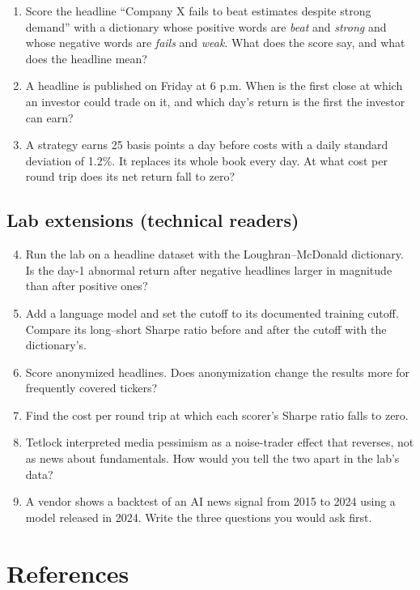 \begin{enumerate}
  \item Score the headline ``Company X fails to beat estimates despite strong demand'' with a dictionary whose positive words are \emph{beat} and \emph{strong} and whose negative words are \emph{fails} and \emph{weak}. What does the score say, and what does the headline mean?
  \item A headline is published on Friday at 6 p.m. When is the first close at which an investor could trade on it, and which day's return is the first the investor can earn?
  \item A strategy earns 25 basis points a day before costs with a daily standard deviation of 1.2\%. It replaces its whole book every day. At what cost per round trip does its net return fall to zero?
\end{enumerate}

\subsection*{Lab extensions (technical readers)}

\begin{enumerate}
  \setcounter{enumi}{3}
  \item Run the lab on a headline dataset with the Loughran--McDonald dictionary. Is the day-1 abnormal return after negative headlines larger in magnitude than after positive ones?
  \item Add a language model and set the cutoff to its documented training cutoff. Compare its long--short Sharpe ratio before and after the cutoff with the dictionary's.
  \item Score anonymized headlines. Does anonymization change the results more for frequently covered tickers?
  \item Find the cost per round trip at which each scorer's Sharpe ratio falls to zero.
  \item Tetlock interpreted media pessimism as a noise-trader effect that reverses, not as news about fundamentals. How would you tell the two apart in the lab's data?
  \item A vendor shows a backtest of an AI news signal from 2015 to 2024 using a model released in 2024. Write the three questions you would ask first.
\end{enumerate}

\section*{References}

